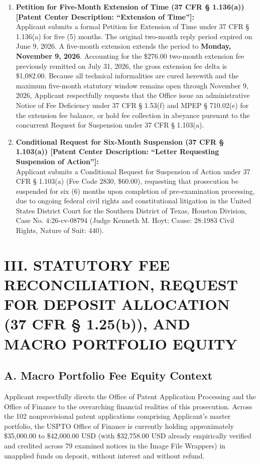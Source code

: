 \documentclass[11pt,letterpaper]{article}
\begin{document}
\begin{enumerate}[leftmargin=*]
    \item \textbf{Petition for Five-Month Extension of Time (37 CFR \S{} 1.136(a)) [Patent Center Description: ``Extension of Time'']:} \\
    Applicant submits a formal Petition for Extension of Time under 37 CFR \S{} 1.136(a) for five (5) months. The original two-month reply period expired on June 9, 2026. A five-month extension extends the period to \textbf{Monday, November 9, 2026}. Accounting for the \$276.00 two-month extension fee previously remitted on July 31, 2026, the gross extension fee delta is \$1,082.00. Because all technical informalities are cured herewith and the maximum five-month statutory window remains open through November 9, 2026, Applicant respectfully requests that the Office issue an administrative Notice of Fee Deficiency under 37 CFR \S{} 1.53(f) and MPEP \S{} 710.02(e) for the extension fee balance, or hold fee collection in abeyance pursuant to the concurrent Request for Suspension under 37 CFR \S{} 1.103(a).

    \item \textbf{Conditional Request for Six-Month Suspension (37 CFR \S{} 1.103(a)) [Patent Center Description: ``Letter Requesting Suspension of Action'']:} \\
    Applicant submits a Conditional Request for Suspension of Action under 37 CFR \S{} 1.103(a) (Fee Code 2830, \$60.00), requesting that prosecution be suspended for six (6) months upon completion of pre-examination processing, due to ongoing federal civil rights and constitutional litigation in the United States District Court for the Southern District of Texas, Houston Division, Case No. 4:26-cv-08794 (Judge Kenneth M. Hoyt; Cause: 28:1983 Civil Rights, Nature of Suit: 440).
\end{enumerate}

\section*{III. STATUTORY FEE RECONCILIATION, REQUEST FOR DEPOSIT ALLOCATION (37 CFR \S{} 1.25(b)), AND MACRO PORTFOLIO EQUITY}

\subsection*{A. Macro Portfolio Fee Equity Context}
Applicant respectfully directs the Office of Patent Application Processing and the Office of Finance to the overarching financial realities of this prosecution. Across the 102 nonprovisional patent applications comprising Applicant's master portfolio, the USPTO Office of Finance is currently holding approximately \$35,000.00 to \$42,000.00 USD (with \$32,758.00 USD already empirically verified and credited across 79 examined notices in the Image File Wrappers) in unapplied funds on deposit, without interest and without refund.
\end{document}
